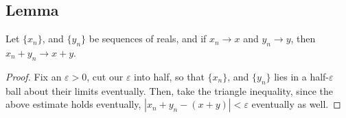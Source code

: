 \documentclass[../../main.tex]{subfiles}
\begin{document}
\subsection{Lemma}
\providecommand{\xn}{\{x_n\}}
\providecommand{\yn}{\{y_n\}}
\begin{lemma}\label{lemma:sequence converges to sum}
    Let $\xn$, and $\yn$ be sequences of reals, and if $x_n\to x$ and $y_n\to y$, then $x_n+y_n\to x+y$.
\end{lemma}
\begin{proof}
    Fix an $\varepsilon>0$, cut our $\varepsilon$ into half, so that $\xn$, and $\yn$ lies in a half-$\varepsilon$ ball about their limits eventually. Then, take the triangle inequality, since the above estimate holds eventually, $|x_n+y_n-(x+y)|<\varepsilon$ eventually as well.
\end{proof}
\end{document}
